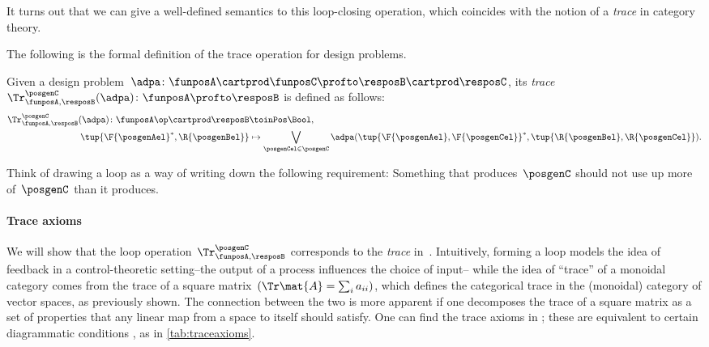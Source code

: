It turns out that we can give a well-defined semantics to this loop-closing operation, which coincides with the notion of a \emph{trace} in category theory.

The following is the formal definition of the trace operation for design problems.

\begin{definition}
    \label{def:dp-trace}
    Given a design problem~$\adpa\colon \funposA \cartprod \funposC \profto \resposB \cartprod \resposC$, its \emph{trace}~$\Tr_{\funposA,\resposB}^\posgenC(\adpa) \colon \funposA \profto \resposB$ is defined as follows:
    \begin{equation}
        \label{eq:tracedef}
        \begin{aligned}
            \Tr_{\funposA,\resposB}^\posgenC(\adpa) \colon  \funposA\op \cartprod \resposB & \toinPos \Bool,                           \\
            \tup{\F{\posgenAel}^*, \R{\posgenBel}}                                         & \mapsto \bigvee_{\posgenCel \in \posgenC}
            \adpa(\tup{\F{\posgenAel}, \F{\posgenCel}}^*,
            \tup{\R{\posgenBel}, \R{\posgenCel}}).
        \end{aligned}
    \end{equation}
\end{definition}

Think of drawing a loop as a way of writing down the following requirement: Something that produces~$\posgenC$ should not use up more of~$\posgenC$ than it produces.


\paragraph{Trace axioms}
We will show that the loop operation~$\Tr_{\funposA,\resposB}^\posgenC$ corresponds to the \emph{trace} in~\DP.
Intuitively, forming a loop models the idea of feedback in a control-theoretic setting--the output of a process influences the choice of input--
while the idea of ``trace'' of a monoidal category comes from the trace of a square matrix~$(\Tr\mat{A} = \sum_i a_{ii})$, which defines the categorical trace in the (monoidal) category of vector spaces, as previously shown.
The connection between the two is more apparent if one decomposes the trace of a square matrix as a set of properties that any linear map from a space to itself should satisfy.
One can find the trace axioms in  \cite{mac2013categories};
these are equivalent to certain diagrammatic conditions \cite{joyal96}, as in \cref{tab:traceaxioms}.

